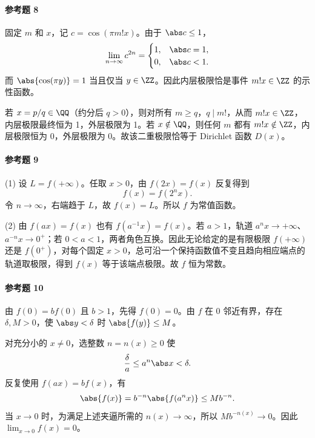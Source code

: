 \paragraph{参考题 8}
\begin{xsolution}
固定 $m$ 和 $x$，记
$c=\cos(\pi m!x)$。由于 $\abs c\leq1$，
\[
  \lim_{n\to\infty}c^{2n}
  =\begin{cases}
    1,&\abs c=1,\\
    0,&\abs c<1.
  \end{cases}
\]
而 $\abs{\cos(\pi y)}=1$ 当且仅当 $y\in\ZZ$。因此内层极限恰是事件
$m!x\in\ZZ$ 的示性函数。

若 $x=p/q\in\QQ$（约分后 $q>0$），则对所有 $m\geq q$，$q\mid m!$，从而
$m!x\in\ZZ$，内层极限最终恒为 1，外层极限为 1。若 $x\notin\QQ$，则任何 $m$ 都有
$m!x\notin\ZZ$，内层极限恒为 0，外层极限为 0。故该二重极限恰等于 Dirichlet 函数 $D(x)$。
\end{xsolution}

\paragraph{参考题 9}
\begin{xsolution}
(1) 设 $L=f(+\infty)$。任取 $x>0$，由 $f(2x)=f(x)$ 反复得到
\[
  f(x)=f(2^n x).
\]
令 $n\to\infty$，右端趋于 $L$，故 $f(x)=L$。所以 $f$ 为常值函数。

(2) 由 $f(ax)=f(x)$ 也有 $f(a^{-1}x)=f(x)$。若 $a>1$，轨道
$a^n x\to+\infty$、$a^{-n}x\to0^+$；若 $0<a<1$，两者角色互换。因此无论给定的是有限极限
$f(+\infty)$ 还是 $f(0^+)$，对每个固定 $x>0$，总可沿一个保持函数值不变且趋向相应端点的轨道取极限，得到 $f(x)$ 等于该端点极限。故 $f$ 恒为常数。
\end{xsolution}

\paragraph{参考题 10}
\begin{xsolution}
由 $f(0)=bf(0)$ 且 $b>1$，先得 $f(0)=0$。由 $f$ 在 0 邻近有界，存在 $\delta,M>0$，使
$\abs y<\delta$ 时 $\abs{f(y)}\leq M$。

对充分小的 $x\ne0$，选整数 $n=n(x)\geq0$ 使
\[
  \frac\delta a\leq a^n\abs x<\delta.
\]
反复使用 $f(ax)=bf(x)$，有
\[
  \abs{f(x)}=b^{-n}\abs{f(a^n x)}\leq Mb^{-n}.
\]
当 $x\to0$ 时，为满足上述夹逼所需的 $n(x)\to\infty$，所以 $Mb^{-n(x)}\to0$。因此
$\lim_{x\to0}f(x)=0$。
\end{xsolution}

